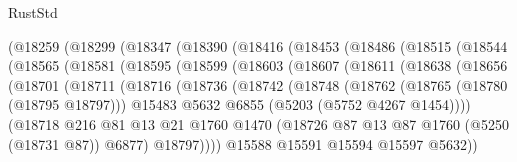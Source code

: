 \begin{lexlean}{RustStd}
\begin{coremodule}
        (@18259
          (@18299
            (@18347
              (@18390
                (@18416
                  (@18453
                    (@18486
                      (@18515
                        (@18544
                          (@18565
                            (@18581
                              (@18595
                                (@18599
                                  (@18603
                                    (@18607
                                      (@18611
                                        (@18638
                                          (@18656
                                            (@18701
                                              (@18711
                                                (@18716
                                                  (@18736
                                                    (@18742
                                                      (@18748
                                                        (@18762
                                                          (@18765 (@18780 (@18795 @18797)))
                                                          @15483
                                                          @5632
                                                          @6855
                                                          (@5203 (@5752 @4267 @1454))))
                                                      (@18718
                                                        @216
                                                        @81
                                                        @13
                                                        @21
                                                        @1760
                                                        @1470
                                                        (@18726
                                                          @87
                                                          @13
                                                          @87
                                                          @1760
                                                          (@5250 (@18731 @87))
                                                          @6877)
                                                        @18797))))
                                                @15588
                                                @15591
                                                @15594
                                                @15597
                                                @5632))

\end{coremodule}
\end{lexlean}
